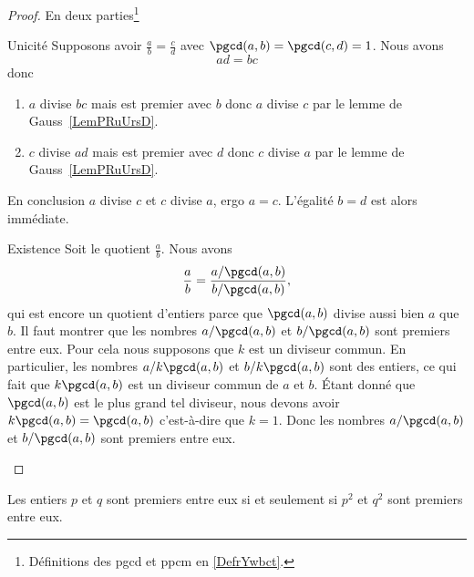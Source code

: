\begin{proof}
    En deux parties\footnote{Définitions des pgcd et ppcm en \ref{DefrYwbct}.}
    \begin{subproof}
        \item[Unicité]
            Supposons avoir \( \frac{ a }{ b }=\frac{ c }{ d }\) avec \( \pgcd(a,b)=\pgcd(c,d)=1\). Nous avons
            \begin{equation}
                ad=bc
            \end{equation}
            donc
            \begin{enumerate}
                \item
                    \( a\) divise \( bc\) mais est premier avec \( b\) donc \( a\) divise \( c\) par le lemme de Gauss~\ref{LemPRuUrsD}.
                \item
                    \( c\) divise \( ad\) mais est premier avec \( d\) donc \( c\) divise \( a\) par le lemme de Gauss~\ref{LemPRuUrsD}.
            \end{enumerate}
            En conclusion \( a\) divise \( c\) et \( c\) divise \( a\), ergo \( a=c\). L'égalité \( b=d\) est alors immédiate.
        \item[Existence]
            Soit le quotient \( \frac{ a }{ b }\). Nous avons
            \begin{equation}
                \frac{ a }{ b }=\frac{ a/\pgcd(a,b) }{ b/\pgcd(a,b) },
            \end{equation}
            qui est encore un quotient d'entiers parce que \( \pgcd(a,b)\) divise aussi bien \( a\) que \( b\). Il faut montrer que les nombres \( a/\pgcd(a,b)\) et \( b/\pgcd(a,b)\) sont premiers entre eux. Pour cela nous supposons que \( k\) est un diviseur commun. En particulier, les nombres \( a/k\pgcd(a,b)\) et \( b/k\pgcd(a,b)\) sont des entiers, ce qui fait que \( k\pgcd(a,b)\) est un diviseur commun de \( a\) et \( b\). Étant donné que \( \pgcd(a,b)\) est le plus grand tel diviseur, nous devons avoir \( k\pgcd(a,b)=\pgcd(a,b)\) c'est-à-dire que \( k=1\). Donc les nombres \( a/\pgcd(a,b)\) et \( b/\pgcd(a,b)\) sont premiers entre eux.
    \end{subproof}
\end{proof}

\begin{proposition}     \label{PROPooRZDDooLJabov}
    Les entiers \( p\) et \( q\) sont premiers entre eux si et seulement si \( p^2\) et \( q^2\) sont premiers entre eux.
\end{proposition}

